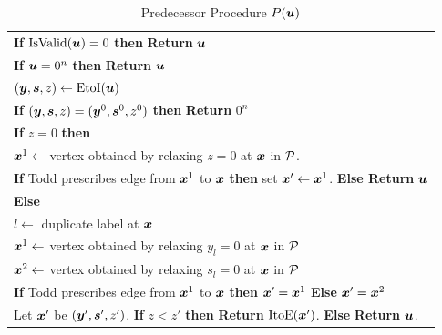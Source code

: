 \begin{table}[!htb]
\caption{Predecessor Procedure $P(\uu)$}\label{tab:P}
\begin{tabular}{|l|}
\hline
\hspace{0pt} {\bf If} $\isvalid(\uu)=0$ {\bf then} {\bf Return} $\uu$\\
\hspace{0pt} {\bf If} $\uu=0^n$ {\bf then} {\bf Return} $\uu$\\
\hspace{0pt} $(\yy,\ps,z) \leftarrow \eti(\uu)$\\
\hspace{0pt} {\bf If} $(\yy,\ps,z)=(\yy^0,\ps^0,z^0)$ {\bf then} {\bf Return} $0^n$\\
\hspace{0pt} {\bf If} $z=0$ {\bf then} \\
\hspace{5pt} $\xx^1\leftarrow$ vertex obtained by relaxing $z=0$ at $\xx$ in $\CPol$. \\
\hspace{5pt} {\bf If} Todd \cite{todd1976orientation} prescribes edge from $\xx^1$ to $\xx$ {\bf then} set $\xx'\leftarrow \xx^1$. {\bf Else Return} $\uu$\\
\hspace{0pt} {\bf Else}\\
\hspace{5pt} $l\leftarrow $ duplicate label at $\xx$\\
\hspace{5pt} $\xx^1\leftarrow $ vertex obtained by relaxing $y_l=0$ at $\xx$ in $\CPol$ \\
\hspace{5pt} $\xx^2\leftarrow $ vertex obtained by relaxing $s_l=0$ at $\xx$ in $\CPol$ \\
\hspace{5pt} {\bf If} Todd \cite{todd1976orientation} prescribes edge from $\xx^1$ to $\xx$ {\bf then} $\xx'=\xx^1$ {\bf Else} $\xx'=\xx^2$\\
\hspace{0pt} Let $\xx'$ be $(\yy',\ps',z')$. {\bf If} $z<z'$ {\bf then} {\bf Return} $\ite(\xx')$. {\bf Else} {\bf Return} $\uu$.\\
\hline
\end{tabular}
\end{table}



